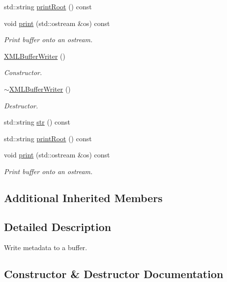 \begin{DoxyCompactItemize}
std\+::string \mbox{\hyperlink{classADATXML_1_1XMLBufferWriter_a5eca1ff89009128d84add6150375a621}{print\+Root}} () const
\item 
void \mbox{\hyperlink{classADATXML_1_1XMLBufferWriter_a1256054ea792711a5ff2807afd4f6404}{print}} (std\+::ostream \&os) const
\begin{DoxyCompactList}\small\item\em Print buffer onto an ostream. \end{DoxyCompactList}\item 
\mbox{\hyperlink{classADATXML_1_1XMLBufferWriter_a237df70a2c5eaf8bcc14c51ea9d4ef5a}{X\+M\+L\+Buffer\+Writer}} ()
\begin{DoxyCompactList}\small\item\em Constructor. \end{DoxyCompactList}\item 
\mbox{\hyperlink{classADATXML_1_1XMLBufferWriter_a211892bc8276e281c03174ff74f94c0f}{$\sim$\+X\+M\+L\+Buffer\+Writer}} ()
\begin{DoxyCompactList}\small\item\em Destructor. \end{DoxyCompactList}\item 
std\+::string \mbox{\hyperlink{classADATXML_1_1XMLBufferWriter_a12021e9b23e88cb760f4b64a8e845e5e}{str}} () const
\item 
std\+::string \mbox{\hyperlink{classADATXML_1_1XMLBufferWriter_a5eca1ff89009128d84add6150375a621}{print\+Root}} () const
\item 
void \mbox{\hyperlink{classADATXML_1_1XMLBufferWriter_a1256054ea792711a5ff2807afd4f6404}{print}} (std\+::ostream \&os) const
\begin{DoxyCompactList}\small\item\em Print buffer onto an ostream. \end{DoxyCompactList}\end{DoxyCompactItemize}
\subsection*{Additional Inherited Members}


\subsection{Detailed Description}
Write metadata to a buffer. 

\subsection{Constructor \& Destructor Documentation}
\mbox{\label{classADATXML_1_1XMLBufferWriter_a237df70a2c5eaf8bcc14c51ea9d4ef5a}} 
